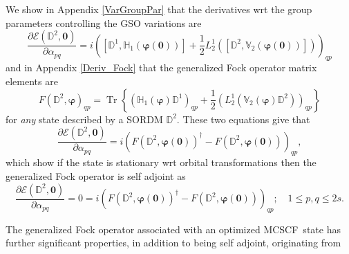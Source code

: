 \documentclass[aps,preprint]{revtex4}%
\begin{document}
We show in Appendix \ref{VarGroupPar} that the derivatives wrt the group
parameters controlling the GSO variations are
\begin{equation}
\frac{\partial\mathcal{E}\left(  \mathbb{D}^{2},\mathbf{0}\right)  }%
{\partial\alpha_{pq}}=i\left(  \left[  \mathbb{D}^{1},\mathbb{H}_{1}\left(
\mathbf{\varphi}\left(  \mathbf{0}\right)  \right)  \right]  +\frac{1}{2}%
L_{2}^{1}\left(  \left[  \mathbb{D}^{2},\mathbb{V}_{2}\left(  \mathbf{\varphi
}\left(  \mathbf{0}\right)  \right)  \right]  \right)  \right)  _{qp}%
\end{equation}
and in Appendix \ref{Deriv_Fock} that the generalized Fock operator matrix
elements are
\begin{equation}
F\left(  \mathbb{D}^{2},\mathbf{\varphi}\right)  _{qp}=\operatorname{Tr}%
\left\{  \left(  \mathbb{H}_{1}\left(  \mathbf{\varphi}\right)  \mathbb{D}%
^{1}\right)  _{qp}+\frac{1}{2}\left(  L_{2}^{1}\left(  \mathbb{V}_{2}\left(
\mathbf{\varphi}\right)  \mathbb{D}^{2}\right)  \right)  _{qp}\right\}
\end{equation}
for \emph{any} state described by a SORDM $\mathbb{D}^{2}$. These two
equations give that
\begin{equation}
\frac{\partial\mathcal{E}\left(  \mathbb{D}^{2},\mathbf{0}\right)  }%
{\partial\alpha_{pq}}=i\left(  F\left(  \mathbb{D}^{2},\mathbf{\varphi}\left(
\mathbf{0}\right)  \right)  ^{\dagger}-F\left(  \mathbb{D}^{2},\mathbf{\varphi
}\left(  \mathbf{0}\right)  \right)  \right)  _{qp},
\end{equation}
which show if the state is stationary wrt orbital transformations then the
generalized Fock operator is self adjoint as
\begin{equation}
\frac{\partial\mathcal{E}\left(  \mathbb{D}^{2},\mathbf{0}\right)  }%
{\partial\alpha_{pq}}=0=i\left(  F\left(  \mathbb{D}^{2},\mathbf{\varphi
}\left(  \mathbf{0}\right)  \right)  ^{\dagger}-F\left(  \mathbb{D}%
^{2},\mathbf{\varphi}\left(  \mathbf{0}\right)  \right)  \right)  _{qp}%
;\quad1\leq p,q\leq2s.
\end{equation}


The generalized Fock operator associated with an optimized MCSCF\ state has
further significant properties, in addition to being self adjoint, originating from
\end{document}
